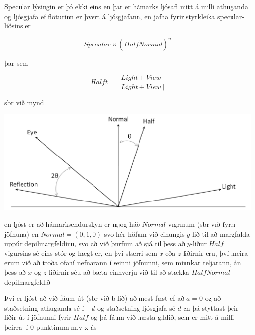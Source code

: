\documentclass[11pt,twocolumn]{article}
\begin{document}
Specular lýsingin er þó ekki eins en þar er hámarks ljósafl mitt á milli athuganda og ljósgjafa ef flöturinn er þvert á ljósgjafann, en jafna fyrir styrkleika specular-liðsins er 

\[
Specular \times (Half \dot Normal)^n
\]

þar sem

\[
Halft = \frac{Light+View}{||Light + View||}
\]

sbr við mynd

\includegraphics[width = \linewidth]{7.png}

en ljóst er að hámarksendurskyn er mjög háð $Normal$ vigrinum (sbr við fyrri jöfnuna) en $Normal = (0,1,0)$ svo hér höfum við einungis $y$-lið til að margfalda uppúr depilmargfeldinu, svo að við þurfum að sjá til þess að $y$-liður $Half$ vigursins sé eins stór og hægt er, en því stærri sem $x$ eða $z$ liðirnir eru, því meira erum við að troða ofaní nefnarann í seinni jöfnunni, sem minnkar teljarann, án þess að $x$ og $z$ liðirnir séu að bæta einhverju við til að stækka $Half \dot Normal$ depilmargfeldið

Því er ljóst að við fáum út (sbr við b-lið) að mest fæst ef að $a = 0$ og að staðsetning athuganda sé í $-d$ og staðsetning ljósgjafa sé $d$ en þá styttast þeir liðir út í jöfnunni fyrir $Half$ og þá fáum við hæsta gildið, sem er mitt á milli þeirra, í $0$ punktinum m.v x-ás
\end{document}

